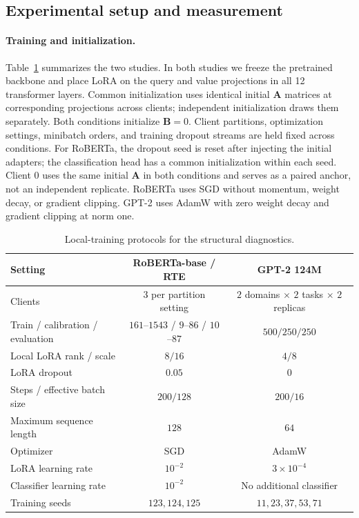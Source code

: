 \documentclass[11pt,letterpaper]{article}
\newcommand{\bA}{\mathbf{A}}
\newcommand{\bB}{\mathbf{B}}
\begin{document}
\subsection{Experimental setup and measurement}
\label{app:diagnostic-protocol}

\paragraph{Training and initialization.}
Table~\ref{tab:diagnostic-protocol} summarizes the two studies. In both studies we freeze
the pretrained backbone and place LoRA on the query and value projections
in all 12 transformer layers. Common initialization uses identical initial
$\bA$ matrices at corresponding projections across clients; independent
initialization draws them separately. Both conditions initialize $\bB=0$.
Client partitions, optimization settings, minibatch orders, and training
dropout streams are held fixed across conditions. For RoBERTa, the dropout
seed is reset after injecting the initial adapters; the classification
head has a common initialization within each seed. Client 0 uses the same
initial $\bA$ in both conditions and serves as a paired anchor, not an
independent replicate. RoBERTa uses SGD without momentum, weight decay, or
gradient clipping. GPT-2 uses AdamW with zero weight decay and gradient
clipping at norm one.
\begin{table}[htbp!]
\centering
\caption{Local-training protocols for the structural diagnostics.}
\label{tab:diagnostic-protocol}
\small
\setlength{\tabcolsep}{5pt}
\begin{tabular}{lcc}
\toprule
Setting & RoBERTa-base / RTE & GPT-2 124M  \\
\midrule
Clients & 3 per partition setting & $2$ domains $\times$ $2$ tasks $\times$ $2$ replicas \\
Train / calibration / evaluation & $161$--$1543$ / $9$--$86$ / $10$--$87$ & $500 / 250 / 250$ \\
Local LoRA rank / scale & $8 / 16$ & $4 / 8$ \\
LoRA dropout & $0.05$ & $0$ \\
Steps / effective batch size & $200 / 128$ & $200 / 16$ \\
Maximum sequence length & $128$ & $64$ \\
Optimizer & SGD & AdamW \\
LoRA learning rate & $10^{-2}$ & $3\times10^{-4}$ \\
Classifier learning rate & $10^{-2}$ & No additional classifier \\
Training seeds & $123,124,125$ & $11,23,37,53,71$ \\
\bottomrule
\end{tabular}
\end{table}
\end{document}
